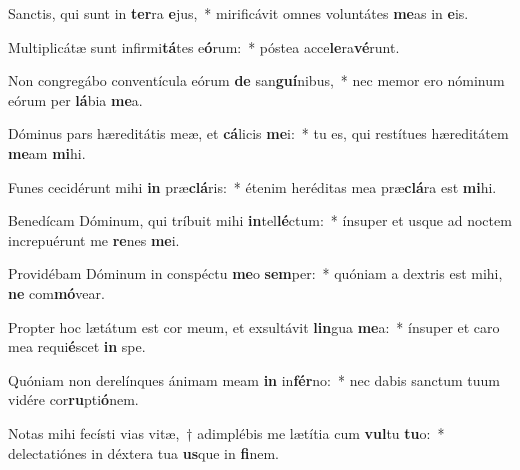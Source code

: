 \item Sanctis, qui sunt in \textbf{ter}ra \textbf{e}jus,~* mirificávit omnes voluntátes \textbf{me}as in \textbf{e}is.
\item Multiplicátæ sunt infirmi\textbf{tá}tes e\textbf{ó}rum:~* póstea acce\textbf{le}ra\textbf{vé}runt.
\item Non congregábo conventícula eórum \textbf{de} san\textbf{guí}nibus,~* nec memor ero nóminum eórum per \textbf{lá}bia \textbf{me}a.
\item Dóminus pars hæreditátis meæ, et \textbf{cá}licis \textbf{me}i:~* tu es, qui restítues hæreditátem \textbf{me}am \textbf{mi}hi.
\item Funes cecidérunt mihi \textbf{in} præ\textbf{clá}ris:~* étenim heréditas mea præ\textbf{clá}ra est \textbf{mi}hi.
\item Benedícam Dóminum, qui tríbuit mihi \textbf{in}tel\textbf{lé}ctum:~* ínsuper et usque ad noctem increpuérunt me \textbf{re}nes \textbf{me}i.
\item Providébam Dóminum in conspéctu \textbf{me}o \textbf{sem}per:~* quóniam a dextris est mihi, \textbf{ne} com\textbf{mó}vear.
\item Propter hoc lætátum est cor meum, et exsultávit \textbf{lin}gua \textbf{me}a:~* ínsuper et caro mea requi\textbf{é}scet \textbf{in} spe.
\item Quóniam non derelínques ánimam meam \textbf{in} in\textbf{fér}no:~* nec dabis sanctum tuum vidére cor\textbf{ru}pti\textbf{ó}nem.
\item Notas mihi fecísti vias vitæ,~† adimplébis me lætítia cum \textbf{vul}tu \textbf{tu}o:~* delectatiónes in déxtera tua \textbf{us}que in \textbf{fi}nem.
